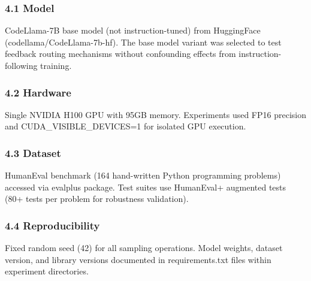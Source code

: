 
\subsubsection{4.1 Model}

CodeLlama-7B base model (not instruction-tuned) from HuggingFace (codellama/CodeLlama-7b-hf). The base model variant was selected to test feedback routing mechanisms without confounding effects from instruction-following training.

\subsubsection{4.2 Hardware}

Single NVIDIA H100 GPU with 95GB memory. Experiments used FP16 precision and CUDA\_VISIBLE\_DEVICES=1 for isolated GPU execution.

\subsubsection{4.3 Dataset}

HumanEval benchmark (164 hand-written Python programming problems) accessed via evalplus package. Test suites use HumanEval+ augmented tests (80+ tests per problem for robustness validation).

\subsubsection{4.4 Reproducibility}

Fixed random seed (42) for all sampling operations. Model weights, dataset version, and library versions documented in requirements.txt files within experiment directories.
